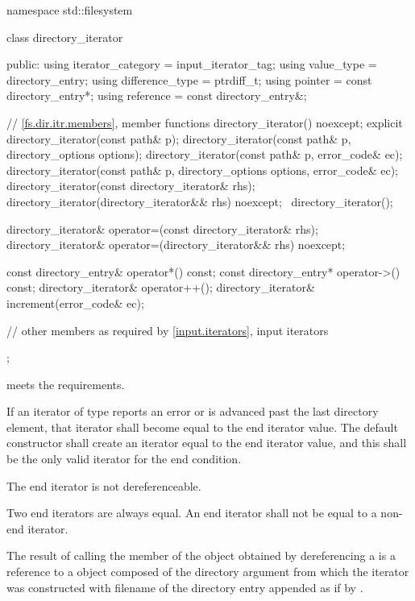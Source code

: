 \begin{codeblock}
namespace std::filesystem {
  class directory_iterator {
  public:
    using iterator_category = input_iterator_tag;
    using value_type        = directory_entry;
    using difference_type   = ptrdiff_t;
    using pointer           = const directory_entry*;
    using reference         = const directory_entry&;

    // \ref{fs.dir.itr.members}, member functions
    directory_iterator() noexcept;
    explicit directory_iterator(const path& p);
    directory_iterator(const path& p, directory_options options);
    directory_iterator(const path& p, error_code& ec);
    directory_iterator(const path& p, directory_options options,
                       error_code& ec);
    directory_iterator(const directory_iterator& rhs);
    directory_iterator(directory_iterator&& rhs) noexcept;
    ~directory_iterator();

    directory_iterator& operator=(const directory_iterator& rhs);
    directory_iterator& operator=(directory_iterator&& rhs) noexcept;

    const directory_entry& operator*() const;
    const directory_entry* operator->() const;
    directory_iterator&    operator++();
    directory_iterator&    increment(error_code& ec);

    // other members as required by \ref{input.iterators}, input iterators
  };
}
\end{codeblock}

\pnum
{} meets the
 requirements.

\pnum
If an iterator of type  reports an error or
is advanced past the last directory element,
that iterator shall become equal to the end iterator
value. The  default constructor shall
create an iterator equal to the end iterator value, and this shall be the only
valid iterator for the end condition.

\pnum
The end iterator is not dereferenceable.

\pnum
Two end iterators are always equal. An end iterator shall not be equal to a non-end
iterator.

\pnum
The result of calling the  member of the  object obtained by dereferencing a  is a reference to a  object composed of the directory argument from which the iterator was
constructed with filename of the directory entry appended as if by .

